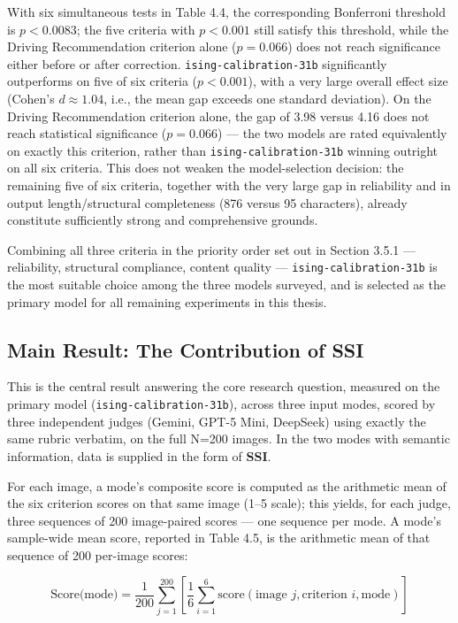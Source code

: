 \documentclass[12pt,a4paper]{report}
\begin{document}
With six simultaneous tests in Table 4.4, the corresponding Bonferroni threshold is $p < 0.0083$; the five criteria with $p < 0.001$ still satisfy this threshold, while the Driving Recommendation criterion alone ($p = 0.066$) does not reach significance either before or after correction. \texttt{ising-calibration-31b} significantly outperforms on five of six criteria ($p<0.001$), with a very large overall effect size (Cohen's $d \approx 1.04$, i.e., the mean gap exceeds one standard deviation). On the Driving Recommendation criterion alone, the gap of 3.98 versus 4.16 does not reach statistical significance ($p=0.066$) --- the two models are rated equivalently on exactly this criterion, rather than \texttt{ising-calibration-31b} winning outright on all six criteria. This does not weaken the model-selection decision: the remaining five of six criteria, together with the very large gap in reliability and in output length/structural completeness (876 versus 95 characters), already constitute sufficiently strong and comprehensive grounds.

Combining all three criteria in the priority order set out in Section 3.5.1 --- reliability, structural compliance, content quality --- \texttt{ising-calibration-31b} is the most suitable choice among the three models surveyed, and is selected as the primary model for all remaining experiments in this thesis.

\subsection{Main Result: The Contribution of SSI}

This is the central result answering the core research question, measured on the primary model (\texttt{ising-calibration-31b}), across three input modes, scored by three independent judges (Gemini, GPT-5 Mini, DeepSeek) using exactly the same rubric verbatim, on the full N=200 images. In the two modes with semantic information, data is supplied in the form of \textbf{SSI}.

For each image, a mode's composite score is computed as the arithmetic mean of the six criterion scores on that same image (1--5 scale); this yields, for each judge, three sequences of 200 image-paired scores --- one sequence per mode. A mode's sample-wide mean score, reported in Table 4.5, is the arithmetic mean of that sequence of 200 per-image scores:

\[
\text{Score(mode)} = \frac{1}{200} \sum_{j=1}^{200} \left[ \frac{1}{6} \sum_{i=1}^{6} \text{score}(\text{image } j, \text{criterion } i, \text{mode}) \right]
\]
\end{document}
